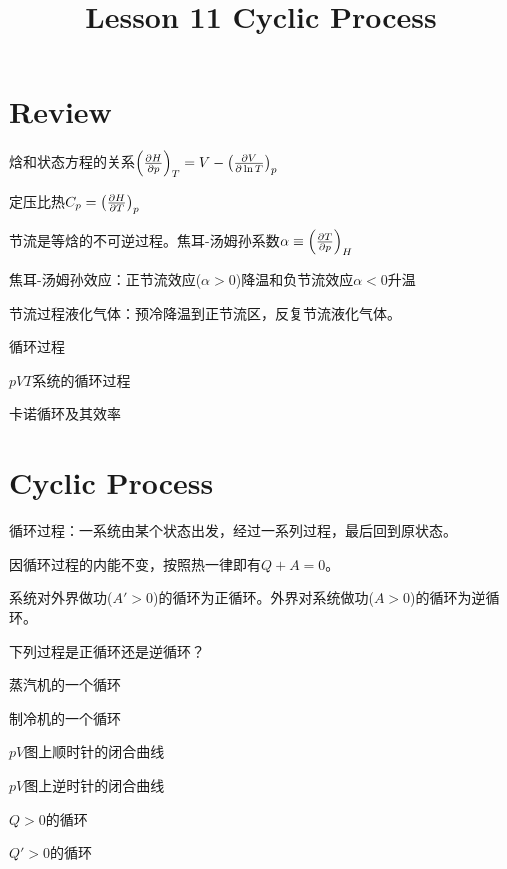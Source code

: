 \documentclass[CJK]{beamer}
\title{Lesson 11 Cyclic Process}
\author{}
\date{}
\begin{document}

\section{Review}

\begin{frame}
\bch 
\bitem
\item{焓和状态方程的关系$\left(\frac{\partial H}{\partial p}\right)_{T} = V - \left(\frac{\partial V}{\partial \ln T}\right)_{p}$}
\item{定压比热$C_p = \left(\frac{\partial H}{\partial T}\right)_{p}$}
\item{节流是等焓的不可逆过程。焦耳-汤姆孙系数$\alpha \equiv \left(\frac{\partial T}{\partial p}\right)_{H}$}
\item{焦耳-汤姆孙效应：正节流效应($\alpha >0$)降温和负节流效应$\alpha<0$升温}
\item{节流过程液化气体：预冷降温到正节流区，反复节流液化气体。}
\eitem
\ech
\end{frame}

\begin{frame}
\bch
\bitem
\item{循环过程}
\item{$pVT$系统的循环过程}
\item{卡诺循环及其效率}
\eitem
\ech
\end{frame}


\section{Cyclic Process}

\begin{frame}
\bch
{}
\ech
\end{frame}

\begin{frame}
\bch
循环过程：一系统由某个状态出发，经过一系列过程，最后回到原状态。

\skiplines

因循环过程的内能不变，按照热一律即有$Q+A = 0$。
\ech
\end{frame}

\begin{frame}
\bch

系统对外界做功($A'>0$)的循环为正循环。外界对系统做功($A>0$)的循环为逆循环。

\ech
\end{frame}

\begin{frame}
\bch
下列过程是正循环还是逆循环？
\bitem
\item{蒸汽机的一个循环}
\item{制冷机的一个循环}
\item{$pV$图上顺时针的闭合曲线}
\item{$pV$图上逆时针的闭合曲线}
\item{$Q>0$的循环}
\item{$Q'>0$的循环}
\eitem
\ech
\end{frame}
\end{document}
